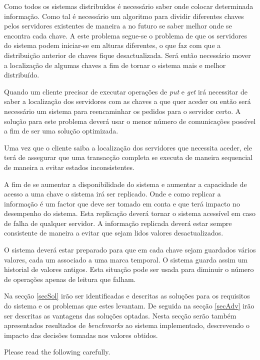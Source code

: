 \documentclass[times, 10pt,twocolumn]{article}
\begin{document}
Como todos os sistemas distribuídos é necessário saber onde colocar determinada informação. Como tal é necessário um algoritmo para dividir diferentes chaves pelos servidores existentes de maneira a no futuro se saber melhor onde se encontra cada chave. A este problema segue-se o problema de que os servidores do sistema podem iniciar-se em alturas diferentes, o que faz com que a distribuição anterior de chaves fique desactualizada. Será então necessário mover a localização de algumas chaves a fim de tornar o sistema mais e melhor distribuído.

Quando um cliente precisar de executar operações de \emph{put} e \emph{get} irá necessitar de saber a localização dos servidores com as chaves a que quer aceder ou então será necessário um sistema para reencaminhar os pedidos para o servidor certo. A solução para este problema deverá usar o menor número de comunicações possível a fim de ser uma solução optimizada.

Uma vez que o cliente saiba a localização dos servidores que necessita aceder, ele terá de assegurar que uma transacção completa se executa de maneira sequencial de maneira a evitar estados inconsistentes.

A fim de se aumentar a disponibilidade do sistema e aumentar a capacidade de acesso a uma chave o sistema irá ser replicado. Onde e como replicar a informação é um factor que deve ser tomado em conta e que terá impacto no desempenho do sistema. Esta replicação deverá tornar o sistema acessível em caso de falha de qualquer servidor. A informação replicada deverá estar sempre consistente de maneira a evitar que sejam lidos valores desactualizados.

O sistema deverá estar preparado para que em cada chave sejam guardados vários valores, cada um associado a uma marca temporal. O sistema guarda assim um historial de valores antigos. Esta situação pode ser usada para diminuir o número de operações apenas de leitura que falham.

Na secção \ref{secSol} irão ser identificadas e descritas as soluções para os requisitos do sistema e os problemas que estes levantam. De seguida na secção \ref{secAdv} irão ser descritas as vantagens das soluções optadas. Nesta secção serão também apresentados resultados de \emph{benchmarks} ao sistema implementado, descrevendo o impacto das decisões tomadas nos valores obtidos.

Please read the following carefully.
\end{document}
